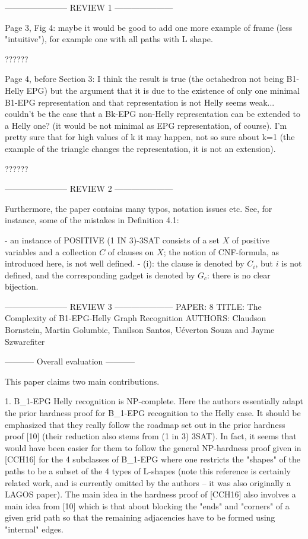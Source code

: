 ----------------------- REVIEW 1 ---------------------


Page 3, Fig 4: maybe it would be good to add one more example of frame (less "intuitive"), for example one with all paths with L shape.

??????

Page 4, before Section 3: I think the result is true (the octahedron not being B1-Helly EPG) but the argument that it is due to the existence of only one minimal B1-EPG representation and that representation is not Helly seems weak... couldn't be the case that a Bk-EPG non-Helly representation can be extended to a Helly one? (it would be not minimal as EPG representation, of course). I'm pretty sure that for high values of k it may happen, not so sure about k=1 (the example of the triangle changes the representation, it is not an extension).

??????

----------------------- REVIEW 2 ---------------------


Furthermore, the paper contains many typos, notation issues etc. See, for instance, some of the mistakes in Definition 4.1:

- an instance of POSITIVE (1 IN 3)-3SAT consists of a set $X$ of positive variables and a collection $C$ of clauses on $X$; the notion of CNF-formula, as introduced here, is not well defined.
- (i): the clause is denoted by $C_i$, but $i$ is not defined, and the corresponding gadget is denoted by $G_c$: there is no clear bijection.



----------------------- REVIEW 3 ---------------------
PAPER: 8
TITLE: The Complexity of B1-EPG-Helly Graph Recognition
AUTHORS: Claudson Bornstein, Martin Golumbic, Tanilson Santos, Uéverton Souza and Jayme Szwarcfiter


----------- Overall evaluation -----------

This paper claims two main contributions. 

1. B_1-EPG Helly recognition is NP-complete. Here the authors essentially adapt the prior hardness proof for B_1-EPG recognition to the Helly case. It should be emphasized that they really follow the roadmap set out in the prior hardness proof [10] (their reduction also stems from (1 in 3) 3SAT). In fact, it seems that would have been easier for them to follow the general NP-hardness proof given in [CCH16] for the 4 subclasses of B_1-EPG where one restricts the "shapes" of the paths to be a subset of the 4 types of L-shapes (note this reference is certainly related work, and is currently omitted by the authors -- it was also originally a LAGOS paper). The main idea in the hardness proof of [CCH16] also involves a main idea from [10] which is that about blocking the "ends" and "corners" of a given grid path so that the remaining adjacencies have to be formed using "internal" edges. 

